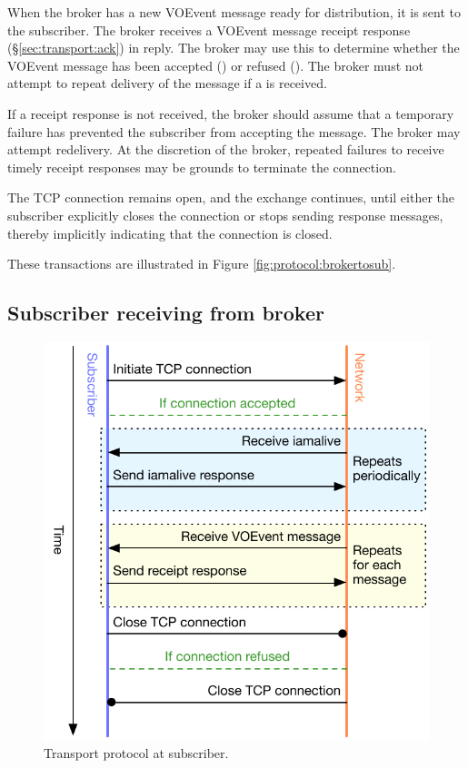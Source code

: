\documentclass[a4paper,11pt]{ivoa}
\begin{document}
When the broker has a new VOEvent message ready for distribution, it is sent
to the subscriber. The broker receives a VOEvent message receipt response
(\S\ref{sec:transport:ack}) in reply. The broker may use this to determine
whether the VOEvent message has been accepted () or refused
(). The broker must not attempt to repeat delivery of the message
if a  is received.

If a receipt response is not received, the broker should assume that a
temporary failure has prevented the subscriber from accepting the message. The
broker may attempt redelivery. At the discretion of the broker, repeated
failures to receive timely receipt responses may be grounds to terminate the
connection.

The TCP connection remains open, and the  exchange
continues, until either the subscriber explicitly closes the connection or
stops sending  response messages, thereby implicitly
indicating that the connection is closed.

These transactions are illustrated in Figure \ref{fig:protocol:brokertosub}.

\subsection{Subscriber receiving from broker}
\label{sec:protocol:subfrombroker}

\begin{figure}
  \begin{center}
  \includegraphics{figures/subfrombroker.pdf}
  \end{center}

  \caption{Transport protocol at subscriber.}

  \label{fig:protocol:subfrombroker}
\end{figure}
\end{document}
